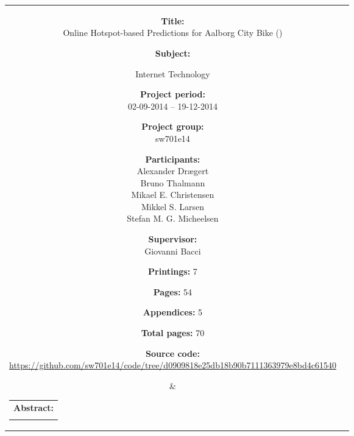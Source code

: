 \begin{titlepage}
\begin{nopagebreak}
{\begin{tabular}{cc}
	\parbox{6cm}{
	\begin{description}
		\item { \textbf{Title:}}\\
			Online Hotspot-based Predictions for Aalborg City Bike (\projectname)
    		\item { \textbf{Subject:}}\\
			\raggedright Internet Technology
		\item { \textbf{Project period:}}\\
			02-09-2014 -- 19-12-2014
 		\hspace{4cm}
		\item { \textbf{Project group:}}\\
  			sw701e14
 		\hspace{4cm}
		\item {\textbf{Participants:}}\\
			Alexander Drægert\\
			Bruno Thalmann\\
			Mikael E. Christensen\\
			Mikkel S. Larsen\\
			Stefan M. G. Micheelsen
		\item { \textbf{Supervisor:}}\\
 			Giovanni Bacci
		\item { \textbf{Printings:} 7 }
		\item { \textbf{Pages:} 54 } 
		\item { \textbf{Appendices:} 5 }
		\item { \textbf{Total pages:} 70 }
		\item { \textbf{Source code:}\\ {\small \mbox{\footnotesize\url{https://github.com/sw701e14/code/tree/d0909818e25db18b90b7111363979e8bd4c61540}}}}
	\end{description}
	\vfill } &
	\parbox{8cm}{
  	\hfill 
  	\begin{tabular}{l}
  		{ \textbf{Abstract:}} \\
  		\fbox{
  		\parbox{8cm}{\smallskip
     		{\vfill{\footnotesize 
     		\smallskip}}}
     	}
   	\end{tabular}}
\end{tabular}
}%
\end{nopagebreak}
\end{titlepage}
